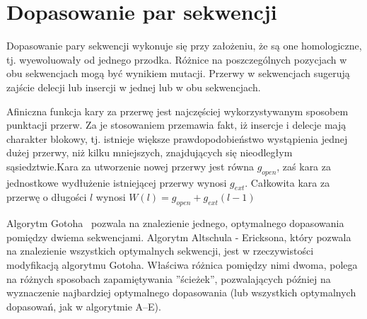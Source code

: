 \documentclass[a4paper,10pt]{article}
\begin{document}
	\section{Dopasowanie par sekwencji}

	Dopasowanie pary sekwencji wykonuje się przy założeniu, że są one homologiczne, tj. wyewoluowały od jednego przodka. Różnice na poszczególnych pozycjach w obu sekwencjach mogą być wynikiem mutacji. Przerwy w sekwencjach sugerują zajście delecji lub insercji w jednej lub w obu sekwencjach.

	Afiniczna funkcja kary za przerwę jest najczęściej wykorzystywanym sposobem punktacji przerw. Za je stosowaniem przemawia fakt, iż insercje i delecje mają charakter blokowy, tj. istnieje większe prawdopodobieństwo wystąpienia jednej dużej przerwy, niż kilku mniejszych, znajdujących się nieodległym sąsiedztwie.Kara za utworzenie nowej przerwy jest równa $g_{open}$, zaś kara za jednostkowe wydłużenie istniejącej przerwy wynosi $g_{ext}$. Całkowita kara za przerwę o długości $l$ wynosi \mbox{$W(l) = g_{open} + g_{ext}(l - 1)$}

	Algorytm Gotoha~\cite{gotoh} pozwala na znalezienie jednego, optymalnego dopasowania  pomiędzy dwiema sekwencjami. Algorytm Altschula - Ericksona\cite{ae}, który pozwala na znalezienie wszystkich optymalnych sekwencji, jest w rzeczywistości modyfikacją algorytmu Gotoha. Właściwa różnica pomiędzy nimi dwoma, polega na różnych sposobach zapamiętywania ''ścieżek'', pozwalających później na wyznaczenie najbardziej optymalnego dopasowania (lub wszystkich optymalnych dopasowań, jak w algorytmie A--E).
\end{document}

